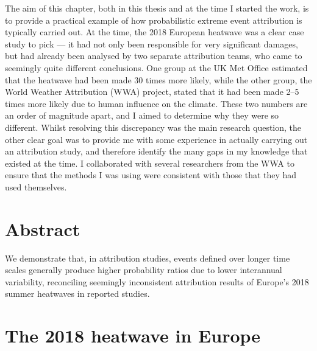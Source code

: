   The aim of this chapter, both in this thesis and at the time I started the work, is to provide a practical example of how probabilistic extreme event attribution is typically carried out. At the time, the 2018 European heatwave was a clear case study to pick --- it had not only been responsible for very significant damages, but had already been analysed by two separate attribution teams, who came to seemingly quite different conclusions. One group at the UK Met Office estimated that the heatwave had been made 30 times more likely, while the other group, the World Weather Attribution (WWA) project, stated that it had been made 2--5 times more likely due to human influence on the climate. These two numbers are an order of magnitude apart, and I aimed to determine why they were so different.  Whilst resolving this discrepancy was the main research question, the other clear goal was to provide me with some experience in actually carrying out an attribution study, and therefore identify the many gaps in my knowledge that existed at the time. I collaborated with several researchers from the WWA to ensure that the methods I was using were consistent with those that they had used themselves. 

\section{Abstract}\label{ch2:abstract}

  We demonstrate that, in attribution studies, events defined over longer time scales generally produce higher probability ratios due to lower interannual variability, reconciling seemingly inconsistent attribution results of Europe's 2018 summer heatwaves in reported studies.

\section{The 2018 heatwave in Europe}\label{ch2:heatwave}

